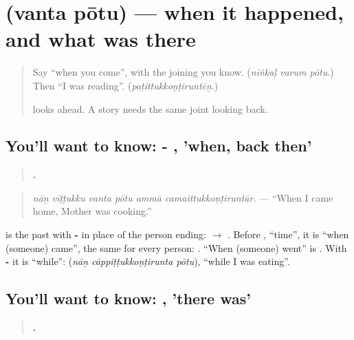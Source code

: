 \section[\texorpdfstring{\ta{வந்த} \ta{போது} (vanta pōtu)}{வந்த போது (vanta pōtu)}]{  (vanta pōtu) — when it happened, and what was there}

\label{lesson:TA-C284-vanta-potu}



\begin{quote}
Say \textquotedblleft{}when you come\textquotedblright{}, with the joining you know. (\emph{nīṅkaḷ varum pōtu}.) Then \textquotedblleft{}I was reading\textquotedblright{}. (\emph{paṭittukkoṇṭiruntēṉ}.)

\textbf{ } looks ahead. A story needs the same joint looking back.
\end{quote}

\subsection*{You'll want to know: - , 'when, back then'}
\begin{quote}
\textbf{     .}
\end{quote}

\begin{quote}
\emph{nāṉ vīṭṭukku vanta pōtu ammā camaittukkoṇṭiruntār.} — \textquotedblleft{}When I came home, Mother was cooking.\textquotedblright{}
\end{quote}

\textbf{} is the past with \textbf{-} in place of the person ending: \textbf{} $\to$ \textbf{}. Before \textbf{}, \textquotedblleft{}time\textquotedblright{}, it is \textquotedblleft{}when (someone) came\textquotedblright{}, the same for every person: \textbf{  }. \textquotedblleft{}When (someone) went\textquotedblright{} is \textbf{ }. With \textbf{-} it is \textquotedblleft{}while\textquotedblright{}: \textbf{  } (\emph{nāṉ cāppiṭṭukkoṇṭirunta pōtu}), \textquotedblleft{}while I was eating\textquotedblright{}.

\subsection*{You'll want to know: , 'there was'}
\begin{quote}
\textbf{     .}
\end{quote}

